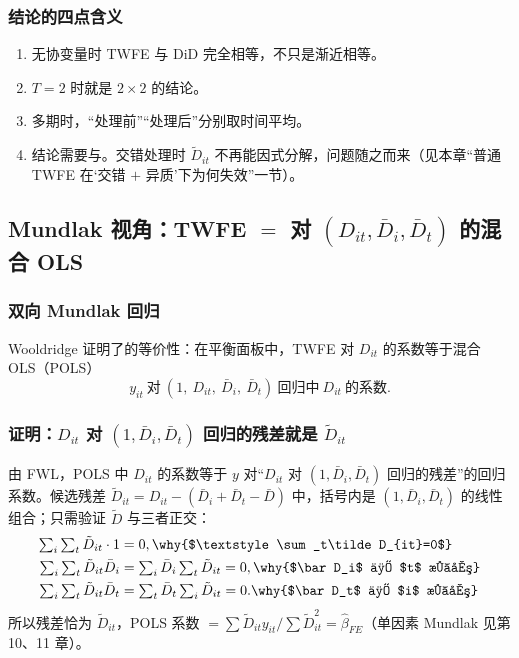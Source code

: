 \subsubsection{结论的四点含义}

\begin{enumerate}
  \item 无协变量时 TWFE 与 DiD 完全相等，不只是渐近相等。
  \item $T=2$ 时就是 $2\times2$ 的结论。
  \item 多期时，“处理前”“处理后”分别取时间平均。
  \item 结论需要与。交错处理时 $\tilde D_{it}$ 不再能因式分解，问题随之而来（见本章“普通 TWFE 在‘交错 $+$ 异质’下为何失效”一节）。
\end{enumerate}

\subsection{Mundlak 视角：TWFE \texorpdfstring{$=$}{=} 对 \texorpdfstring{$(D_{it},\bar D_i,\bar D_t)$}{(D, D bar i, D bar t)} 的混合 OLS}

\subsubsection{双向 Mundlak 回归}

Wooldridge 证明了的等价性：在平衡面板中，TWFE 对 $D_{it}$ 的系数等于混合 OLS（POLS）
\[
y_{it}\ \text{对}\ (1,\ D_{it},\ \bar D_i,\ \bar D_t)\ \text{回归中}\ D_{it}\ \text{的系数}.
\]

\subsubsection{证明：\texorpdfstring{$D_{it}$}{D} 对 \texorpdfstring{$(1,\bar D_i,\bar D_t)$}{(1, D bar i, D bar t)} 回归的残差就是 \texorpdfstring{$\tilde D_{it}$}{D tilde}}

由 FWL，POLS 中 $D_{it}$ 的系数等于 $y$ 对“$D_{it}$ 对 $(1,\bar D_i,\bar D_t)$ 回归的残差”的回归系数。候选残差 $\tilde D_{it}=D_{it}-(\bar D_i+\bar D_t-\bar D)$ 中，括号内是 $(1,\bar D_i,\bar D_t)$ 的线性组合；只需验证 $\tilde D$ 与三者正交：
\begin{align*}
\textstyle\sum_i\sum_t\tilde D_{it}\cdot1&=0, \why{$\textstyle\sum_t\tilde D_{it}=0$}\\
\textstyle\sum_i\sum_t\tilde D_{it}\bar D_i&=\textstyle\sum_i\bar D_i\sum_t\tilde D_{it}=0, \why{$\bar D_i$ 与 $t$ 无关}\\
\textstyle\sum_i\sum_t\tilde D_{it}\bar D_t&=\textstyle\sum_t\bar D_t\sum_i\tilde D_{it}=0. \why{$\bar D_t$ 与 $i$ 无关}
\end{align*}
所以残差恰为 $\tilde D_{it}$，POLS 系数 $=\sum\tilde D_{it}y_{it}/\sum\tilde D_{it}^2=\hat\beta_{FE}$（单因素 Mundlak 见第 10、11 章）。

